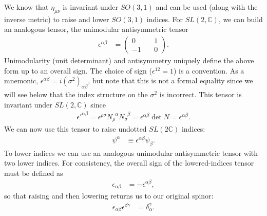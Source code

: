 \documentclass[12pt, oneside]{report}    %
\begin{document}
We know that $\eta_{\mu\nu}$ is invariant under $SO(3,1)$ and can be used (along with the inverse metric) to raise and lower $SO(3,1)$ indices. For $SL(2,\mathbb{C})$, we can build an analogous tensor, the unimodular antisymmetric tensor
\begin{align}
    \epsilon^{\alpha\beta} %
    &= \begin{pmatrix}
        0 \quad& 1 \\
        -1 \quad& 0
    \end{pmatrix}.\label{eq:SUSYalg:epsilonupper}
\end{align}
Unimodularity (unit determinant) and antisymmetry uniquely define the above form
up to an overall sign. The choice of sign ($\epsilon^{12}=1$) is a convention. As a mnemonic, $\epsilon^{\alpha\beta}=i\left(\sigma^2\right)_{\alpha\beta}$, but note that this is not a formal equality since we will see below that the index structure on the $\sigma^2$ is incorrect. %
 This tensor is invariant under $SL(2,\mathbb C)$ since
\begin{align}
    \epsilon'^{\alpha\beta} = \epsilon^{\rho\sigma}N_\rho^{\phantom{\rho}\alpha}N_\sigma^{\phantom\sigma\beta}
    =\epsilon^{\alpha\beta}\det N
    = \epsilon^{\alpha\beta}.
\end{align}
We can now use this tensor to raise undotted $SL(2\mathbb{C})$ indices:
\begin{align}
    \psi^\alpha &\equiv \epsilon^{\alpha\beta}\psi_\beta.
\end{align}
To lower indices we can use an analogous unimodular antisymmetric tensor with two lower indices.
For consistency, the overall sign of the lowered-indices tensor must be defined as
\begin{align}
    \epsilon_{\alpha\beta} &= -\epsilon^{\alpha\beta},
\end{align}
so that raising and then lowering returns us to our original spinor:
\begin{align}
    \epsilon_{\alpha\beta}\epsilon^{\beta\gamma} &= \delta^\gamma_\alpha.
\end{align}
\end{document}
